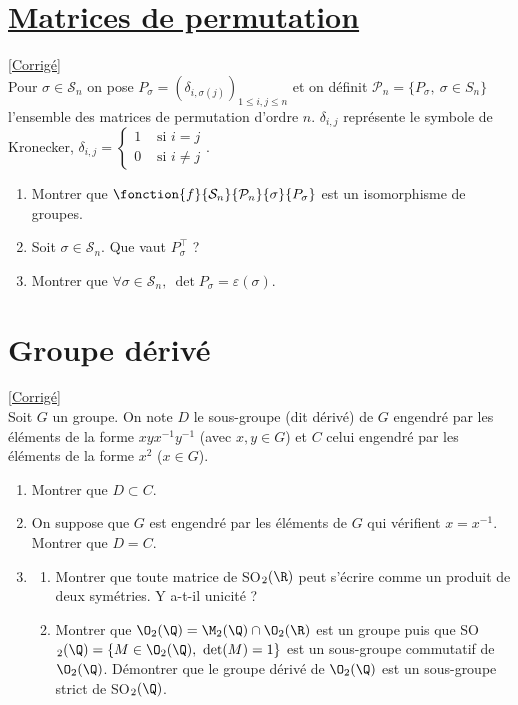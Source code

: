 \documentclass[8pt]{book}
\begin{document}
	\section{\underline{Matrices de permutation} }
	\label{Matrices de permutation}
	\textcolor{blue}{\hyperref[Matrices de permutation corrigé]{[Corrigé]}}\\
	Pour $\sigma\in \mathcal{S}_n$ on pose $P_\sigma=(\delta_{i,\sigma(j)})_{1\leq i,j\leq n}$ et on définit $\mathcal{P}_n=\{ P_\sigma,\ \sigma\in S_n\}$ l'ensemble des matrices de permutation d'ordre $n$. $\delta_{i,j}$ représente le symbole de Kronecker, $\delta_{i,j}=\begin{cases}1&\mbox{ si }i=j\\0&\mbox{ si }i\ne j\end{cases}$.
	\begin{enumerate}
		\item Montrer que $\fonction{f}{\mathcal{S}_n}{\mathcal{P}_n}{\sigma}{P_\sigma}$ est un isomorphisme de groupes.
		\item Soit $\sigma\in \mathcal{S}_n$. Que vaut $P_\sigma^\top$ ?
		\item Montrer que $\forall \sigma\in \mathcal{S}_n,\ \det P_\sigma=\varepsilon(\sigma)$.
	\end{enumerate}
	
	\section{Groupe dérivé }
	\label{Groupe dérivé}
	\textcolor{blue}{\hyperref[Groupe dérivé corrigé]{[Corrigé]}}\\
	Soit $G$ un groupe. On note $D$ le sous-groupe (dit dérivé) de $G$ engendré par les éléments de la forme $xyx^{-1}y^{-1}$ (avec $x,y\in G$) et $C$ celui engendré par les éléments de la forme $x^2$ ($x\in G$).
	\begin{enumerate}
		\item Montrer que $D\subset C$.
		\item On suppose que $G$ est engendré par les éléments de $G$ qui vérifient $x=x^{-1}$. Montrer que $D=C$.
		\item 
		\begin{enumerate}[label=\alph*.]
			\item Montrer que toute matrice de SO$_2(\R)$ peut s'écrire comme un produit de deux symétries. Y a-t-il unicité ?
			\item Montrer que $\O_2(\Q)=\M_2(\Q)\cap\O_2(\R)$ est un groupe puis que SO$_2(\Q)=\{M\in \O_2(\Q),\ \det(M)=1\}$ est un sous-groupe commutatif de $\O_2(\Q)$. Démontrer que le groupe dérivé de $\O_2(\Q)$ est un sous-groupe strict de SO$_2(\Q)$.
		\end{enumerate}
	\end{enumerate}
	
\end{document}
